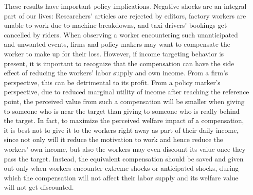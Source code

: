 \documentclass[reviewmode,AEJ]{AEA}
\begin{document}
These results have important policy implications. Negative shocks are an integral part of our lives: Researchers' articles are rejected by editors, factory workers are unable to work due to machine breakdowns, and taxi drivers' bookings get cancelled by riders. When observing a worker encountering such unanticipated and unwanted events,  firms and policy makers may want to compensate the worker to make up for their loss. However, if income targeting behavior is present, it is important to recognize that the compensation can have the side effect of reducing the workers' labor supply and own income. From a firm's perspective, this can be detrimental to its profit. From a policy marker's perspective, due to reduced marginal utility of income after reaching the reference point, the perceived value from such a compensation will be smaller when giving to someone who is near the target than giving to someone who is really behind the target. In fact, to maximize the perceived welfare impact of a compensation, it is best not to give it to the workers right away as part of their daily income, since not only will it reduce the motivation to work and hence reduce the workers' own income, but also the workers may even discount its value once they pass the target. Instead, the equivalent compensation should be saved and given out only when workers encounter extreme shocks or anticipated shocks, during which the compensation will not affect their labor supply and its welfare value will not get discounted.

\end{document}
